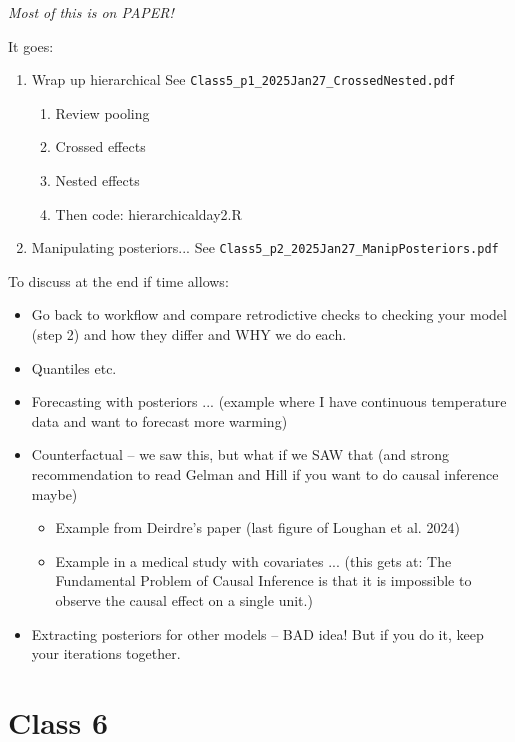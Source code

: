 \documentclass[11pt]{article}
\begin{document}

\emph{Most of this is on PAPER!} 

It goes:
\begin{enumerate}
\item Wrap up hierarchical  See  \verb|Class5_p1_2025Jan27_CrossedNested.pdf| 

\begin{enumerate}
\item Review pooling 
\item Crossed effects
\item Nested effects
\item Then code: hierarchicalday2.R
\end{enumerate}
\item Manipulating posteriors... See  \verb|Class5_p2_2025Jan27_ManipPosteriors.pdf| 
\end{enumerate}


To discuss at the end if time allows:
\begin{itemize}
\item Go back to workflow and compare retrodictive checks to checking your model (step 2) and how they differ and WHY we do each. 
\item Quantiles etc.
\item Forecasting with posteriors ... (example where I have continuous temperature data and want to forecast more warming)
\item Counterfactual -- we saw this, but what if we SAW that (and strong recommendation to read Gelman and Hill if you want to do causal inference maybe) 
\begin{itemize}
\item Example from Deirdre's paper (last figure of Loughan et al. 2024)
\item Example in a medical study with covariates ... (this gets at: The Fundamental Problem of Causal Inference is that it is impossible to observe the causal effect on a single unit.)
\end{itemize}
\item Extracting posteriors for other models -- BAD idea! But if you do it, keep your iterations together.
\end{itemize}



\newpage
\section{Class 6} 
\end{document}

